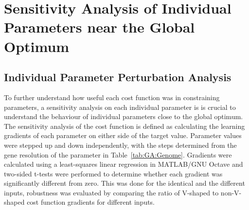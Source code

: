 
\section[Individual parameter sensitivity]{Sensitivity Analysis of Individual Parameters near the Global Optimum}\label{sec:GA:IndividualSens}

\subsection{Individual Parameter Perturbation Analysis}\label{sec:GA:indiv-param-pert}

To further understand how useful each cost function was in
constraining parameters, a sensitivity analysis on each individual
parameter is is crucial to understand the behaviour of individual
parameters close to the global optimum.  The sensitivity analysis of
the cost function is defined as calculating the learning gradients of
each parameter on either side of the target value. Parameter values
were stepped up and down independently, with the steps determined from
the gene resolution of the parameter in
Table~\ref{tab:GA:Genome}. Gradients were calculated using a
least-squares linear regression in MATLAB/GNU Octave and two-sided
t-tests were performed to determine whether each gradient was
significantly different from zero.  This was done for the identical
and the different {\ANF} inputs, robustness was evaluated by comparing
the ratio of V-shaped to non-V-shaped cost function gradients for
different inputs.

\smallskip{}

